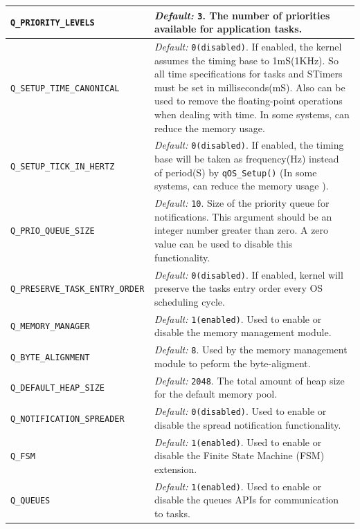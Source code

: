 \documentclass{article}
\begin{document}
\begin{adjustbox}{width=\textwidth,totalheight={18cm}}
\begin{tabularx}
{\textwidth}{l X}
\hline
{\lstinline!Q_PRIORITY_LEVELS!} & \textit{Default:} {\lstinline!3!}.  The number of priorities available for application tasks.\\
\hline
{\lstinline!Q_SETUP_TIME_CANONICAL!} & \textit{Default:}
{\lstinline!0(disabled)!}. If enabled, the kernel assumes the timing base to 1mS(1KHz). So all time specifications for tasks and STimers must be set in milliseconds(mS). Also can be used to remove the floating-point operations when dealing with time. In some systems, can reduce the memory usage. \\
\hline
{\lstinline!Q_SETUP_TICK_IN_HERTZ!} & \textit{Default:} {\lstinline!0(disabled)!}. If enabled, the timing base will be taken as frequency(Hz) instead of period(S) by {\lstinline!qOS_Setup()!} (In some systems, can reduce the memory usage ). \\
\hline
{\lstinline!Q_PRIO_QUEUE_SIZE!} & \textit{Default:} {\lstinline!10!}.  Size of the priority queue for notifications. This argument should be an integer number greater than zero. A zero value can be used to disable this functionality.\\
\hline
{\lstinline!Q_PRESERVE_TASK_ENTRY_ORDER !} & \textit{Default:} {\lstinline!0(disabled)!}. If enabled, kernel will preserve the tasks entry order every OS scheduling cycle.\\
\hline
{\lstinline!Q_MEMORY_MANAGER!} & \textit{Default:} {\lstinline!1(enabled)!}. Used to enable or disable the memory management module. \\
\hline
{\lstinline!Q_BYTE_ALIGNMENT!} & \textit{Default:} {\lstinline!8!}. Used by the memory management module to peform the byte-aligment. \\
\hline
{\lstinline!Q_DEFAULT_HEAP_SIZE!} & \textit{Default:} {\lstinline!2048!}. The total amount of heap size for the default memory pool. \\
\hline
{\lstinline!Q_NOTIFICATION_SPREADER!} & \textit{Default:} {\lstinline!0(disabled)!}. Used to enable or disable the spread notification functionality. \\
\hline
{\lstinline!Q_FSM!} & \textit{Default:} {\lstinline!1(enabled)!}.  Used to enable or disable the Finite State Machine (FSM) extension. \\
\hline
{\lstinline!Q_QUEUES!} & \textit{Default:} {\lstinline!1(enabled)!}.  Used to enable or disable the queues APIs for communication to tasks. \\

\end{tabularx}
\end{adjustbox}
\end{document}
